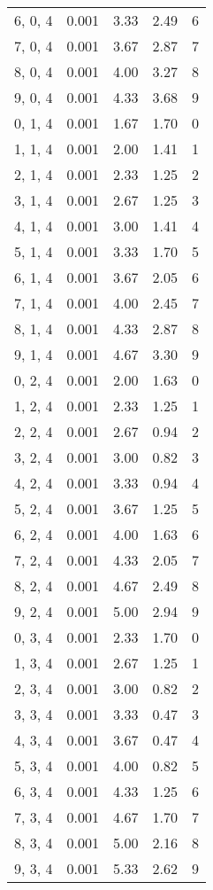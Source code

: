 \documentclass[12pt]{article}
\begin{document}
\begin{tabular}{c || c || c | c | c}
6, 0, 4 & 0.001 & 3.33 & 2.49 & 6 \\
7, 0, 4 & 0.001 & 3.67 & 2.87 & 7 \\
8, 0, 4 & 0.001 & 4.00 & 3.27 & 8 \\
9, 0, 4 & 0.001 & 4.33 & 3.68 & 9 \\
0, 1, 4 & 0.001 & 1.67 & 1.70 & 0 \\
1, 1, 4 & 0.001 & 2.00 & 1.41 & 1 \\
2, 1, 4 & 0.001 & 2.33 & 1.25 & 2 \\
3, 1, 4 & 0.001 & 2.67 & 1.25 & 3 \\
4, 1, 4 & 0.001 & 3.00 & 1.41 & 4 \\
5, 1, 4 & 0.001 & 3.33 & 1.70 & 5 \\
6, 1, 4 & 0.001 & 3.67 & 2.05 & 6 \\
7, 1, 4 & 0.001 & 4.00 & 2.45 & 7 \\
8, 1, 4 & 0.001 & 4.33 & 2.87 & 8 \\
9, 1, 4 & 0.001 & 4.67 & 3.30 & 9 \\
0, 2, 4 & 0.001 & 2.00 & 1.63 & 0 \\
1, 2, 4 & 0.001 & 2.33 & 1.25 & 1 \\
2, 2, 4 & 0.001 & 2.67 & 0.94 & 2 \\
3, 2, 4 & 0.001 & 3.00 & 0.82 & 3 \\
4, 2, 4 & 0.001 & 3.33 & 0.94 & 4 \\
5, 2, 4 & 0.001 & 3.67 & 1.25 & 5 \\
6, 2, 4 & 0.001 & 4.00 & 1.63 & 6 \\
7, 2, 4 & 0.001 & 4.33 & 2.05 & 7 \\
8, 2, 4 & 0.001 & 4.67 & 2.49 & 8 \\
9, 2, 4 & 0.001 & 5.00 & 2.94 & 9 \\
0, 3, 4 & 0.001 & 2.33 & 1.70 & 0 \\
1, 3, 4 & 0.001 & 2.67 & 1.25 & 1 \\
2, 3, 4 & 0.001 & 3.00 & 0.82 & 2 \\
3, 3, 4 & 0.001 & 3.33 & 0.47 & 3 \\
4, 3, 4 & 0.001 & 3.67 & 0.47 & 4 \\
5, 3, 4 & 0.001 & 4.00 & 0.82 & 5 \\
6, 3, 4 & 0.001 & 4.33 & 1.25 & 6 \\
7, 3, 4 & 0.001 & 4.67 & 1.70 & 7 \\
8, 3, 4 & 0.001 & 5.00 & 2.16 & 8 \\
9, 3, 4 & 0.001 & 5.33 & 2.62 & 9 \\

\end{tabular}
\end{document}
